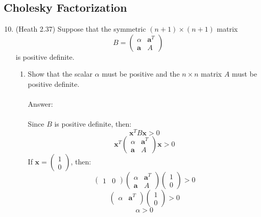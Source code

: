 \documentclass{article}
\renewcommand{\vec}[1]{\mathbf{#1}}
\begin{document}
\subsection*{Cholesky Factorization}
\begin{enumerate}
\setcounter{enumi}{9}
\item (Heath 2.37) Suppose that the symmetric $(n+1) \times (n+1)$ matrix
$$
B = \begin{pmatrix}
\alpha & \vec{a}^T \\
\vec{a} & A
\end{pmatrix}
$$
is positive definite.
\begin{enumerate}
\item Show that the scalar $\alpha$ must be positive and the $n \times n$ matrix $A$ must be positive definite.\\
\\
Answer:\\
\\
Since $B$ is positive definite, then:
$$\vec{x}^TB\vec{x}>0$$
$$\vec{x}^T\begin{pmatrix}
\alpha & \vec{a}^T \\
\vec{a} & A
\end{pmatrix}\vec{x}>0$$
If $\vec{x}=\begin{pmatrix}1\\0\end{pmatrix}$, then:
$$\begin{pmatrix}1&0\end{pmatrix}
\begin{pmatrix}
\alpha & \vec{a}^T \\
\vec{a} & A
\end{pmatrix}\begin{pmatrix}1\\0\end{pmatrix}>0
$$
$$\begin{pmatrix}
\alpha & \vec{a}^T \\
\end{pmatrix}\begin{pmatrix}1\\0\end{pmatrix}>0
$$
$$ \alpha > 0 $$


\end{enumerate}
\end{enumerate}
\end{document}
